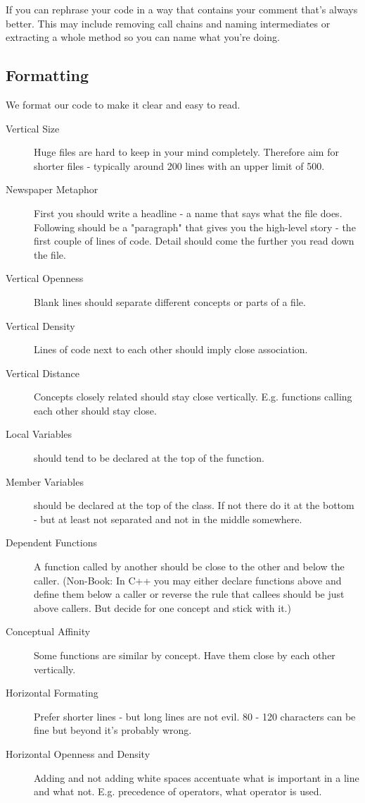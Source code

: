 \documentclass[a4paper, twocolumn]{article}
\begin{document}
If you can rephrase your code in a way that contains your comment that's always better. This may include removing call chains and naming intermediates or extracting a whole method so you can name what you're doing.

\subsection{Formatting}
We format our code to make it clear and easy to read.
\begin{description}
	\item[Vertical Size] Huge files are hard to keep in your mind completely. Therefore aim for shorter files - typically around 200 lines with an upper limit of 500.
	\item[Newspaper Metaphor] First you should write a headline - a name that says what the file does. Following should be a "paragraph" that gives you the high-level story - the first couple of lines of code. Detail should come the further you read down the file.
	\item[Vertical Openness] Blank lines should separate different concepts or parts of a file.
	\item[Vertical Density] Lines of code next to each other should imply close association.
	\item[Vertical Distance] Concepts closely related should stay close vertically. E.g. functions calling each other should stay close.
	\item[Local Variables] should tend to be declared at the top of the function.
	\item[Member Variables] should be declared at the top of the class. If not there do it at the bottom - but at least not separated and not in the middle somewhere.
	\item[Dependent Functions] A function called by another should be close to the other and below the caller. (Non-Book: In C++ you may either declare functions above and define them below a caller or reverse the rule that callees should be just above callers. But decide for one concept and stick with it.)
	\item[Conceptual Affinity] Some functions are similar by concept. Have them close by each other vertically.
	\item[Horizontal Formating] Prefer shorter lines - but long lines are not evil. 80 - 120 characters can be fine but beyond it's probably wrong.
	\item[Horizontal Openness and Density] Adding and not adding white spaces accentuate what is important in a line and what not. E.g. precedence of operators, what operator is used.

\end{description}
\end{document}

